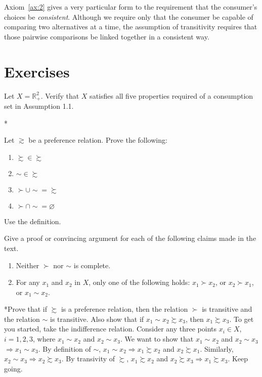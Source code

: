 \documentclass[b5paper]{memoir}
\def\chex{}
\begin{document}
Axiom~\ref{ax:2} gives a very particular form to the requirement that the consumer’s
choices be \emph{consistent}. Although we require only that the consumer be capable of
comparing two alternatives at a time, the assumption of transitivity requires that those
pairwise comparisons be linked together in a consistent way.

\section{Exercises}

\chex{Let $X= \mathbb{R}^2_+$. Verify that $X$ satisfies all five properties required of a
consumption set in Assumption 1.1.}

\chex*{\label{chex:1-2}Let $\gtrsim$ be a preference relation. Prove the following:
\begin{enumerate}[\quad(1)] 
\item $\succsim \in \succsim$
\item $\sim \in \succsim$
\item $\succ \cup \sim = \succsim$
\item $\succ \cap \sim = \varnothing$
\end{enumerate}
}%
{Use the definition.}

\chex{Give a proof or convincing argument for each of the following claims made in the
text. \begin{enumerate}[\quad(1)] \item Neither $\succ$ nor $\sim$ is complete. \item For
any $x_1$ and $x_2$ in $X$, only one of the following holds: $x_1 \succ x_2$, or $x_2
\succ x_1$, or $x_1 \sim x_2$. \end{enumerate} }


\chex*{\label{chex:1-4}Prove that if $\succsim$ is a preference relation, then the
relation $\succ$ is transitive and the relation $\sim$ is transitive. Also show that if
$x_1 \sim x_2 \succsim x_3$, then $x_1 \succsim x_3$.}%
{To get you started, take the indifference relation. Consider any three points $x_i \in
X$, $i=1, 2, 3$, where $x_1 \sim x_2$ and $x_2 \sim x_3$. We want to show that $x_1 \sim
x_2$ and $x_2 \sim x_3$ $\Rightarrow x_1 \sim x_3$. By definition of $\sim$, $x_1 \sim x_2
\Rightarrow x_1 \succsim x_2$ and $x_2 \succsim x_1$. Similarly, $x_2 \sim x_3 \Rightarrow
x_2 \succsim x_3$. By transivity of $\succsim$, $x_1 \succsim x_2$ and $x_2 \succsim x_3
\Rightarrow x_1 \succsim x_3$. Keep going.}
\end{document}
